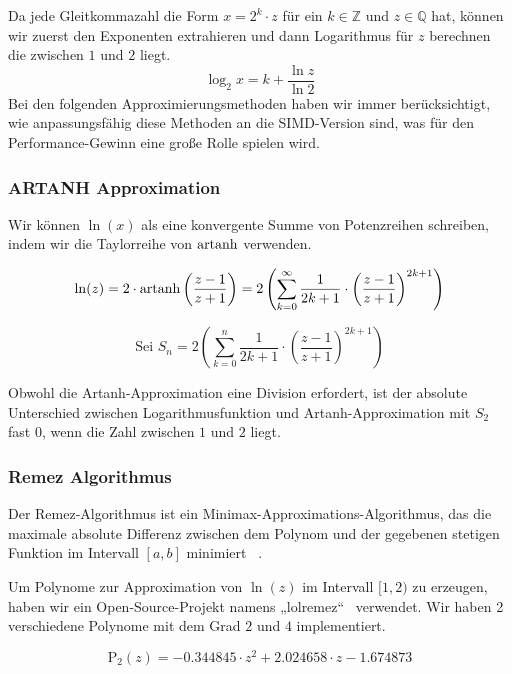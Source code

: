 Da jede Gleitkommazahl die Form $x = 2^{k} \cdot z$ für ein $k \in \mathbb{Z}$ und $ z \in \mathbb{Q}$ hat, können wir zuerst den Exponenten extrahieren und dann Logarithmus für $z$ berechnen die zwischen $1$ und $2$ liegt.
\[\log_2{x} = k + \frac{\ln{z}}{\ln{2}}\]
Bei den folgenden Approximierungsmethoden haben wir immer berücksichtigt, wie anpassungsfähig diese Methoden an die SIMD-Version sind, was für den Performance-Gewinn eine große Rolle spielen wird.

\subsubsection{ARTANH Approximation}
Wir können $\ln(x)$ als eine  konvergente Summe von Potenzreihen schreiben, indem wir die Taylorreihe von $\operatorname{artanh}$ verwenden. 

\begin{equation}
    \ln(z) = 2 \cdot \operatorname{artanh}\left(\frac{z-1}{z+1}\right) = 2\left(\sum _{k=0}^{\infty}{\frac{1}{2k+1} \cdot \left(\frac{z-1}{z+1}\right)^{2k+1}}\right)
\end{equation}

\begin{equation}
   \text{Sei }  S_{n} = 2\left(\sum _{k=0}^{n}{\frac{1}{2k+1} \cdot \left(\frac{z-1}{z+1}\right)^{2k+1}}\right)
   \label{eq:artanh}
\end{equation}

Obwohl die Artanh-Approximation eine Division erfordert, ist der absolute Unterschied zwischen Logarithmusfunktion und Artanh-Approximation mit $S_{2}$ fast $0$, wenn die Zahl zwischen $1$ und $2$ liegt.

\subsubsection{Remez Algorithmus}
Der Remez-Algorithmus ist ein Minimax-Approximations-Algorithmus, das die maximale absolute Differenz zwischen dem Polynom und der gegebenen stetigen Funktion im Intervall $[a,b]$ minimiert ~\cite{remez}.

Um Polynome zur Approximation von $\ln(z)$ im Intervall $[1,2)$ zu erzeugen, haben wir ein Open-Source-Projekt namens „lolremez“~\cite{lolremez} verwendet.
Wir haben 2 verschiedene Polynome mit dem Grad $2$ und $4$ implementiert.

\begin{equation}
    \mathrm{P_{2}}(z) = -0.344845 \cdot z^{2}+ 2.024658 \cdot z -1.674873
    \label{eq:deg2}
\end{equation}

